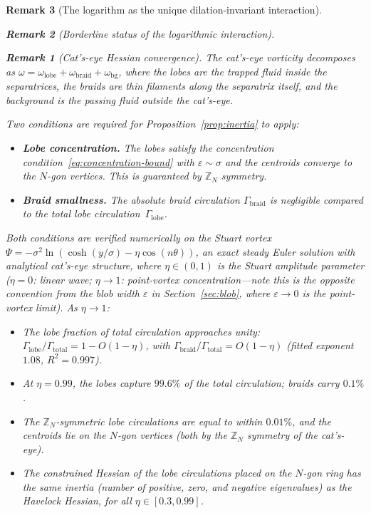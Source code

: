 \documentclass[12pt, a4paper]{article}
\newtheorem{remark}{Remark}[section]
\numberwithin{equation}{section}
\begin{document}
\begin{remark}[The logarithm as the unique dilation-invariant interaction]
\begin{remark}[Borderline status of the logarithmic interaction]
\begin{remark}[Cat's-eye Hessian convergence]
\label{rem:catseye}
The cat's-eye vorticity decomposes as
$\omega = \omega_{\mathrm{lobe}} + \omega_{\mathrm{braid}} +
\omega_{\mathrm{bg}}$, where the lobes are the trapped fluid inside
the separatrices, the braids are thin filaments along the separatrix
itself, and the background is the passing fluid outside the cat's-eye.

Two conditions are required for Proposition~\ref{prop:inertia} to
apply:
\begin{itemize}
  \item[(i)] \textbf{Lobe concentration.}  The lobes satisfy the
    concentration condition~\eqref{eq:concentration-bound} with
    $\varepsilon \sim \sigma$ and the centroids converge to the
    $N$-gon vertices.  This is guaranteed by $\mathbb{Z}_N$ symmetry.
  \item[(ii)] \textbf{Braid smallness.}  The absolute braid circulation
    $\Gamma_{\mathrm{braid}}$ is negligible compared to the total
    lobe circulation~$\Gamma_{\mathrm{lobe}}$.
\end{itemize}

Both conditions are verified numerically on the Stuart vortex
$\Psi = -\sigma^2\ln(\cosh(y/\sigma) - \eta\cos(n\theta))$,
an exact steady Euler solution with analytical cat's-eye structure,
where $\eta \in (0,1)$ is the Stuart amplitude parameter ($\eta = 0$:
linear wave; $\eta \to 1$: point-vortex concentration---note this is
the opposite convention from the blob width $\varepsilon$ in
Section~\ref{sec:blob}, where $\varepsilon \to 0$ is the point-vortex
limit).  As $\eta \to 1$:
\begin{itemize}
  \item The lobe fraction of total circulation approaches unity:
    $\Gamma_{\mathrm{lobe}}/\Gamma_{\mathrm{total}} =
    1 - O(1{-}\eta)$, with
    $\Gamma_{\mathrm{braid}}/\Gamma_{\mathrm{total}} =
    O(1{-}\eta)$ (fitted exponent $1.08$, $R^2 = 0.997$).
  \item At $\eta = 0.99$, the lobes capture $99.6\%$ of the
    total circulation; braids carry $0.1\%$.
  \item The $\mathbb{Z}_N$-symmetric lobe circulations are equal to
    within $0.01\%$, and the centroids lie on the $N$-gon vertices
    (both by the $\mathbb{Z}_N$ symmetry of the cat's-eye).
  \item The constrained Hessian of the lobe circulations placed on
    the $N$-gon ring has the \emph{same inertia} (number of positive,
    zero, and negative eigenvalues) as the Havelock Hessian, for all
    $\eta \in [0.3, 0.99]$.
\end{itemize}


\end{remark}
\end{remark}
\end{remark}
\end{document}

